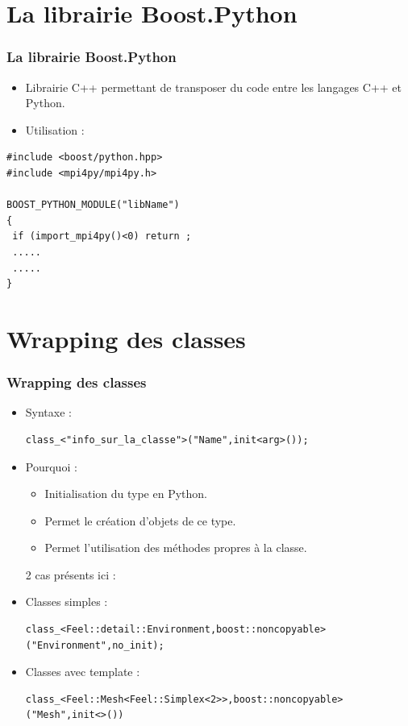 \documentclass[french,10pt]{beamer}
\begin{document}
\section{La librairie Boost.Python}
\begin{frame}[fragile]
\frametitle{La librairie Boost.Python}
\begin{itemize}
\item Librairie C++ permettant de transposer du code entre les langages C++ et Python.
\vspace{1 cm}
\item Utilisation : 
\end{itemize}
\begin{lstlisting}
#include <boost/python.hpp>
#include <mpi4py/mpi4py.h>

BOOST_PYTHON_MODULE("libName")
{
 if (import_mpi4py()<0) return ;
 .....
 .....
}
\end{lstlisting}
\end{frame}

\section{Wrapping des classes}
\begin{frame}[fragile]
\frametitle{Wrapping des classes}
\begin{itemize}
\item Syntaxe : \\
\begin{lstlisting}
class_<"info_sur_la_classe">("Name",init<arg>());
\end{lstlisting}
\item Pourquoi : 
\begin{itemize}
\item Initialisation du type en Python.
\item Permet le création d'objets de ce type.
\item Permet l'utilisation des méthodes propres à la classe.
\end{itemize}
2 cas présents ici :
\item Classes simples :
\begin{lstlisting}
class_<Feel::detail::Environment,boost::noncopyable>("Environment",no_init);
\end{lstlisting}
\item Classes avec template :
\begin{lstlisting}
class_<Feel::Mesh<Feel::Simplex<2>>,boost::noncopyable>("Mesh",init<>())
\end{lstlisting}
\end{itemize}
\end{frame}
\end{document}
